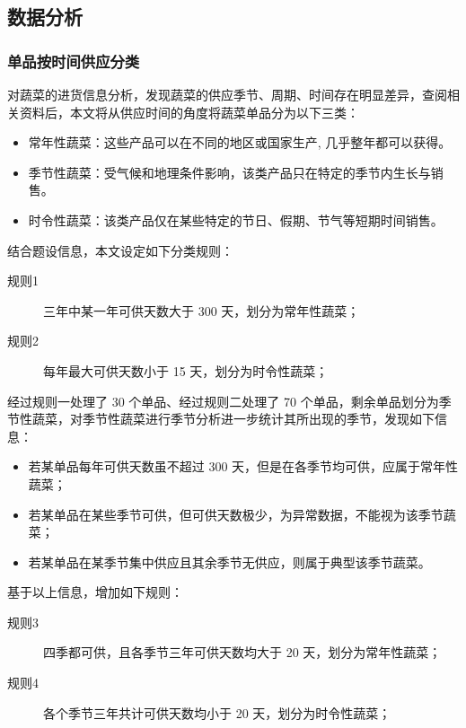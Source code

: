 \documentclass[withoutpreface,bwprint]{cumcmthesis} %
\begin{document}
\subsection{数据分析}

\subsubsection{单品按时间供应分类}
对蔬菜的进货信息分析，发现蔬菜的供应季节、周期、时间存在明显差异，查阅相关资料后，本文将从供应时间的角度将蔬菜单品分为以下三类：
\begin{itemize}
    \item 常年性蔬菜：这些产品可以在不同的地区或国家生产, 几乎整年都可以获得。
    \item 季节性蔬菜：受气候和地理条件影响，该类产品只在特定的季节内生长与销售。
    \item 时令性蔬菜：该类产品仅在某些特定的节日、假期、节气等短期时间销售。
\end{itemize}

结合题设信息，本文设定如下分类规则：

\begin{description}
    \item[规则1] 三年中某一年可供天数大于 300 天，划分为常年性蔬菜；
    \item[规则2] 每年最大可供天数小于 15 天，划分为时令性蔬菜；
\end{description}

经过规则一处理了 30 个单品、经过规则二处理了 70 个单品，剩余单品划分为季节性蔬菜，对季节性蔬菜进行季节分析进一步统计其所出现的季节，发现如下信息：

\begin{itemize}
    \item 若某单品每年可供天数虽不超过 300 天，但是在各季节均可供，应属于常年性蔬菜；
    \item 若某单品在某些季节可供，但可供天数极少，为异常数据，不能视为该季节蔬菜；
    \item 若某单品在某季节集中供应且其余季节无供应，则属于典型该季节蔬菜。
\end{itemize}

基于以上信息，增加如下规则：

\begin{description}
    \item[规则3] 四季都可供，且各季节三年可供天数均大于 20 天，划分为常年性蔬菜；
    \item[规则4] 各个季节三年共计可供天数均小于 20 天，划分为时令性蔬菜；
\end{description}
\end{document}
